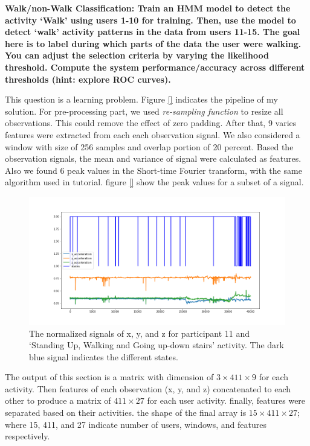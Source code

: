 \item \textbf{Walk/non-Walk Classification: Train an HMM model to detect the activity ‘Walk’ using users 1-10 for training. Then, use the model to detect ‘walk’ activity patterns in the data from users 11-15. The goal here is to label during which parts of the data the user were walking. You can adjust the selection criteria by varying the likelihood threshold. Compute the system performance/accuracy across different thresholds (hint: explore ROC curves).}

This question is a learning problem. Figure \ref{} indicates the pipeline of my solution. For pre-processing part, we used \emph{re-sampling function} to resize all observations. This could remove the effect of zero padding. After that, 9 varies features were extracted from each each observation signal. We also considered a window with size of 256 samples and overlap portion of 20 percent. Based the observation signals, the mean and variance of signal were calculated as features. Also we found 6 peak values in the Short-time Fourier transform, with the same algorithm used in tutorial. figure \ref{} show the peak values for a subset of a signal.
\begin{figure}[H]
    \centering
    \begin{minipage}[b]{1\textwidth}
        \includegraphics[width=\textwidth]{manuscript/src/figures/Ass3/Ass3_Q2_states_user_10N.png}
    \end{minipage}
    \caption{The normalized signals of x, y, and z for participant 11 and ‘Standing  Up,  Walking  and  Going  up-down  stairs’ activity. The dark blue signal indicates the different states.}
    \label{fig:Ass3_Q2_states_user_10N}
\end{figure}

The output of this section is a matrix with dimension of $3 \times 411 \times 9$ for each activity. 
Then features of each observation (x, y, and z) concatenated to each other to produce a matrix of $411 \times 27$ for each user activity. finally, features were separated based on their activities. the shape of the final array is $15 \times 411 \times 27$; where 15, 411, and 27 indicate number of users, windows, and features respectively.  

